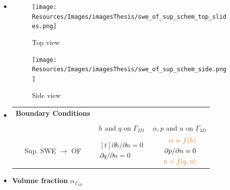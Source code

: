 \begin{frame}
\hspace{-1cm}
\begin{minipage}{0.2\textwidth}
\vspace{1cm}
\begin{itemize}
\setlength{\leftmargini}{0pt}
\item<2->[]
\begin{figure}
\texttt{[image: Resources/Images/imagesThesis/swe\_of\_sup\_schem\_top\_slides.png]}
\caption{Top view}
\texttt{[image: Resources/Images/imagesThesis/swe\_of\_sup\_schem\_side.png]}
\caption{Side view}
\end{figure}
\end{itemize}
\end{minipage}
\hspace{1.3cm}
\begin{minipage}{0.3\textwidth}
\vspace{-0.5cm}
\footnotesize
\begin{itemize}
\setlength{\leftmargini}{0pt}
\item<3->[]
\begin{table}[!ht]
\centering
\begin{tabular}{ccc}
\textbf{Boundary Conditions} & & \\ \\ \hline
  &$ h$ and $q$ on $\Gamma_{2D}$ & $\alpha, p$ and $u$ on $\Gamma_{3D}$ \\\hline
Sup. {SWE $\rightarrow$ OF}  & $\begin{aligned}[t] {\partial{h}/\partial{n} = 0} \\ {\partial{q}/\partial{n} = 0} \end{aligned}$                 &  $\begin{aligned}[t] {\myTUMorange{\alpha = f(h)}} \\ {\partial{p}/\partial{n} = 0}  \\ \myTUMorange{u = f(q,u)}   \end{aligned}$ 
\end{tabular}
\end{table}
\end{itemize}
\end{minipage}
\hspace{2cm}
\begin{minipage}{0.38\textwidth}
\vspace{1cm}
\begin{itemize}
\setlength{\leftmargini}{0pt}
\item<4->[]
\small
\textbf{Volume fraction} ${\alpha_{\Gamma_{3D}}}$
\begin{align*}

\end{align*}
\end{itemize}
\end{minipage}
\end{frame}

